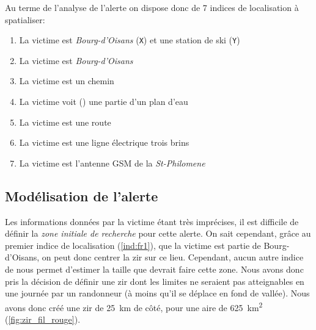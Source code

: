 Au terme de l'analyse de l'alerte on dispose donc de 7 indices de
localisation à spatialiser:
% 
\begin{enumerate}
\item \label{ind:fr1} La victime est
  \emph{Bourg-d'Oisans} (\texttt{X}) et une station de ski
  (\texttt{Y})
\item \label{ind:fr2} La victime est
   \emph{Bourg-d'Oisans} 
\item \label{ind:fr3} La victime est  un
  chemin
\item \label{ind:fr4} La victime voit ()
  une partie d'un plan d'eau
\item \label{ind:fr5} La victime est  une
  route
\item \label{ind:fr6} La victime est  une
  ligne électrique trois brins
\item \label{ind:fr7} La victime est 
  l'antenne GSM de la \emph{St-Philomene}
\end{enumerate}

\subsection{Modélisation de l'alerte}
\label{subsec:9-4-2}

Les informations données par la victime étant très imprécises, il est
difficile de définir la \emph{zone initiale de recherche} pour cette
alerte. On sait cependant, grâce au premier indice de localisation
(\ref{ind:fr1}), que la victime est partie de Bourg-d'Oisans, on peut
donc centrer la \ac{zir} sur ce lieu. Cependant, aucun autre indice de
nous permet d'estimer la taille que devrait faire cette zone. Nous
avons donc pris la décision de définir une \ac{zir} dont les limites
ne seraient pas atteignables en une journée par un randonneur (à moins
qu'il se déplace en fond de vallée).
%
Nous avons donc créé une \ac{zir} de \SI{25}{\kilo\meter} de côté,
pour une aire de \SI{625}{\kilo\meter\squared}
(\autoref{fig:zir_fil_rouge}).

